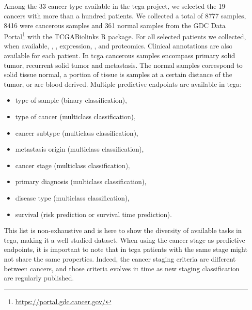 \documentclass[../main.tex]{subfiles}
\begin{document}
 \subsection{}
	 Among the 33 cancer type available in the \gls{tcga} project, we selected the 19 cancers with more than a hundred patients.
	 We collected a total of 8777 samples, 8416 were cancerous samples and 361 normal samples from the GDC Data Portal\footnote{\url{https://portal.gdc.cancer.gov/}} with the \textsf{TCGABiolinks} R package.
	 For all selected patients we collected, when available, , ,  expression, , and proteomics.
	 Clinical annotations are also available for each patient.
	 In \gls{tcga} cancerous samples encompass primary solid tumor, recurrent solid tumor and metastasis.
	 The normal samples correspond to solid tissue normal, a portion of tissue is samples at a certain distance of the tumor, or are blood derived.
	 Multiple predictive endpoints are available in \gls{tcga}:
	 \begin{itemize}[nosep]
		 \item type of sample (binary classification),
		 \item type of cancer (multiclass classification),
		 \item cancer subtype (multiclass classification),
		 \item metastasis origin (multiclass classification),
		 \item cancer stage (multiclass classification),
		 \item primary diagnosis (multiclass classification),
		 \item disease type (multiclass classification),
		 \item survival (risk prediction or survival time prediction).
	 \end{itemize}
	 This list is non-exhaustive and is here to show the diversity of available tasks in \gls{tcga}, making it a well studied dataset.
	 When using the cancer stage as predictive endpoints, it is important to note that in \gls{tcga} patients with the same stage might not share the same properties.
	 Indeed, the cancer staging criteria are different between cancers, and those criteria evolves in time as new staging classification are regularly published.

\end{document}
